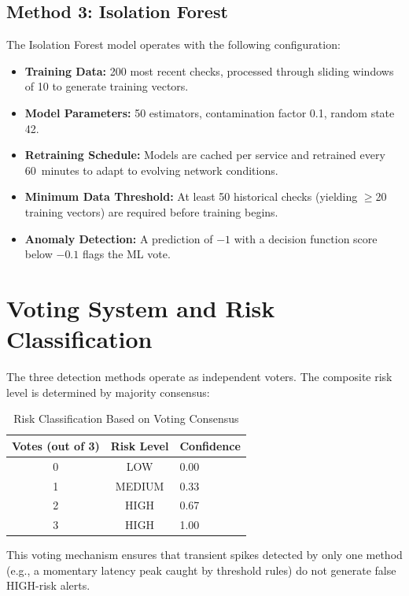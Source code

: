 \documentclass[12pt,a4paper,oneside]{report}
\begin{document}
\subsection{Method 3: Isolation Forest}
\noindent The Isolation Forest model operates with the following configuration:
\begin{itemize}[label=\textbullet, leftmargin=*]
    \item \textbf{Training Data:} 200 most recent checks, processed through sliding windows of 10 to generate training vectors.
    \item \textbf{Model Parameters:} 50 estimators, contamination factor 0.1, random state 42.
    \item \textbf{Retraining Schedule:} Models are cached per service and retrained every 60~minutes to adapt to evolving network conditions.
    \item \textbf{Minimum Data Threshold:} At least 50 historical checks (yielding $\geq$20 training vectors) are required before training begins.
    \item \textbf{Anomaly Detection:} A prediction of $-1$ with a decision function score below $-0.1$ flags the ML vote.
\end{itemize}

\section{Voting System and Risk Classification}
\noindent The three detection methods operate as independent voters. The composite risk level is determined by majority consensus:

\begin{table}[H]
\centering
\begin{tabularx}{0.7\textwidth}{|c|c|X|}
\hline
\textbf{Votes (out of 3)} & \textbf{Risk Level} & \textbf{Confidence} \\
\hline
0 & LOW & 0.00 \\
\hline
1 & MEDIUM & 0.33 \\
\hline
2 & HIGH & 0.67 \\
\hline
3 & HIGH & 1.00 \\
\hline
\end{tabularx}
\caption{Risk Classification Based on Voting Consensus}
\label{tab:voting}
\end{table}

\noindent This voting mechanism ensures that transient spikes detected by only one method (e.g., a momentary latency peak caught by threshold rules) do not generate false HIGH-risk alerts.
\end{document}
